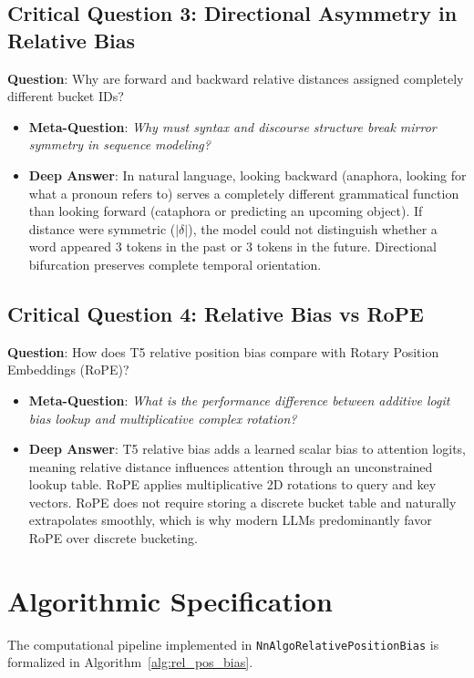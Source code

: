 \documentclass[11pt,a4paper]{article}
\theoremstyle{definition}
\begin{document}
\subsection{\textbf{Critical Question 3: Directional Asymmetry in Relative Bias}}
\textbf{Question}: Why are forward and backward relative distances assigned completely different bucket IDs?
\begin{itemize}
    \item \textbf{Meta-Question}: \emph{Why must syntax and discourse structure break mirror symmetry in sequence modeling?}
    \item \textbf{Deep Answer}: In natural language, looking backward (anaphora, looking for what a pronoun refers to) serves a completely different grammatical function than looking forward (cataphora or predicting an upcoming object). If distance were symmetric ($|\delta|$), the model could not distinguish whether a word appeared 3 tokens in the past or 3 tokens in the future. Directional bifurcation preserves complete temporal orientation.
\end{itemize}

\subsection{\textbf{Critical Question 4: Relative Bias vs RoPE}}
\textbf{Question}: How does T5 relative position bias compare with Rotary Position Embeddings (RoPE)?
\begin{itemize}
    \item \textbf{Meta-Question}: \emph{What is the performance difference between additive logit bias lookup and multiplicative complex rotation?}
    \item \textbf{Deep Answer}: T5 relative bias adds a learned scalar bias to attention logits, meaning relative distance influences attention through an unconstrained lookup table. RoPE applies multiplicative 2D rotations to query and key vectors. RoPE does not require storing a discrete bucket table and naturally extrapolates smoothly, which is why modern LLMs predominantly favor RoPE over discrete bucketing.
\end{itemize}

\section{Algorithmic Specification}

The computational pipeline implemented in \texttt{NnAlgoRelativePositionBias} is formalized in Algorithm~\ref{alg:rel_pos_bias}.
\end{document}
